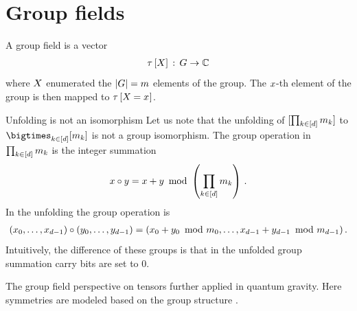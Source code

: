 \section{Group fields}\label{sec:groupFields}

A group field is a vector
\begin{align*}
    \tau\left[X\right] \,:\, G \rightarrow \mathbb{C}
\end{align*}
where $X$ enumerated the $\left|G\right|=m$ elements of the group.
The $x$-th element of the group is then mapped to $\tau\left[X_{}=x_{}\right]$.

\begin{example}{Unfolding is not an isomorphism}
    Let us note that the unfolding of $[\prod_{k\in[d]}m_{k}]$ to $\facstates$ is not a group isomorphism.
    The group operation in $\prod_{k\in[d]}m_{k}$ is the integer summation
    \begin{align*}
        x \circ y =
        x + y \,\,\,\mathrm{mod}\,\, \left(\prod_{k\in[d]}m_{k}\right) \, .
    \end{align*}
    In the unfolding the group operation is
    \begin{align*}
        (x_{0},\ldots,x_{d-1}) \circ (y_{0},\ldots,y_{d-1})
        = (x_{0}+y_{0}\,\,\,\mathrm{mod}\,\, m_{0},\ldots,x_{d-1}+y_{d-1}\,\,\,\mathrm{mod}\,\, m_{d-1}) \, .
    \end{align*}
    Intuitively, the difference of these groups is that in the unfolded group summation carry bits are set to $0$.

\end{example}

The group field perspective on tensors further applied in quantum gravity.
Here symmetries are modeled based on the group structure \cite{chirco_group_2018,chirco_group_2020}.